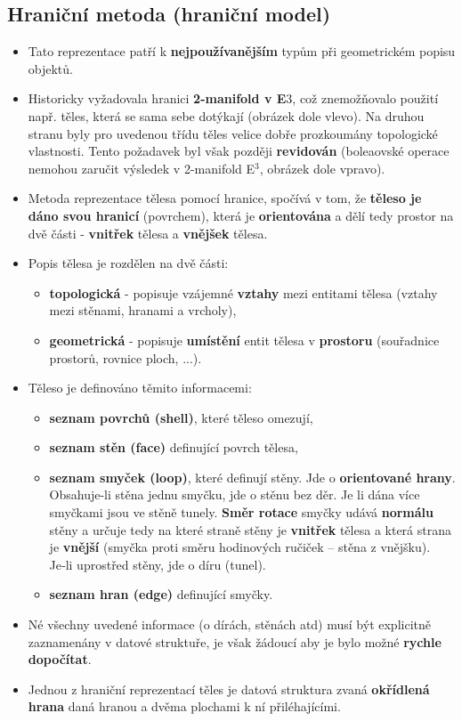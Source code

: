  \subsection{Hraniční metoda (hraniční model)}
 \begin{itemize}
 	\item Tato reprezentace patří k \textbf{nejpoužívanějším} typům při geometrickém popisu objektů.
 	\item Historicky vyžadovala hranici \textbf{2-manifold v E$3$}, což znemožňovalo použití např. těles, která se sama sebe dotýkají (obrázek dole vlevo). Na druhou stranu byly pro uvedenou třídu těles velice dobře prozkoumány topologické vlastnosti. Tento požadavek byl však později \textbf{revidován} (boleaovské operace nemohou zaručit výsledek v 2-manifold E$^3$, obrázek dole vpravo).
 	\item Metoda reprezentace tělesa pomocí hranice, spočívá v tom, že \textbf{těleso je dáno svou hranicí} (povrchem), která je \textbf{orientována} a dělí tedy prostor na dvě části - \textbf{vnitřek} tělesa a \textbf{vnějšek} tělesa.
 	\item Popis tělesa je rozdělen na dvě části:
 	\begin{itemize}
		\item \textbf{topologická} - popisuje vzájemné \textbf{vztahy} mezi entitami tělesa (vztahy mezi stěnami, hranami a vrcholy),
		\item \textbf{geometrická} - popisuje \textbf{umístění} entit tělesa v \textbf{prostoru} (souřadnice prostorů, rovnice ploch, ...).
 	\end{itemize}
 	\item Těleso je definováno těmito informacemi:
 	\begin{itemize}
		\item	\textbf{seznam povrchů (shell)}, které těleso omezují,
		\item	\textbf{seznam stěn (face)} definující povrch tělesa,
		\item	\textbf{seznam smyček (loop)}, které definují stěny. Jde o \textbf{orientované hrany}. Obsahuje-li stěna jednu smyčku, jde o stěnu bez děr. Je li dána více smyčkami jsou ve stěně tunely. \textbf{Směr rotace} smyčky udává \textbf{normálu} stěny a určuje tedy na které straně stěny je \textbf{vnitřek} tělesa a která strana je \textbf{vnější} (smyčka proti směru hodinových ručiček – stěna z vnějšku). Je‑li uprostřed stěny, jde o díru (tunel).
		\item	\textbf{seznam hran (edge)} definující smyčky.
 	\end{itemize}
 	\item Né všechny uvedené informace (o dírách, stěnách atd) musí být explicitně zaznamenány v datové struktuře, je však žádoucí aby je bylo možné \textbf{rychle dopočítat}.
 	\item Jednou z hraniční reprezentací těles je datová struktura zvaná \textbf{okřídlená hrana} daná hranou a dvěma plochami k ní přiléhajícími.
 \end{itemize}

